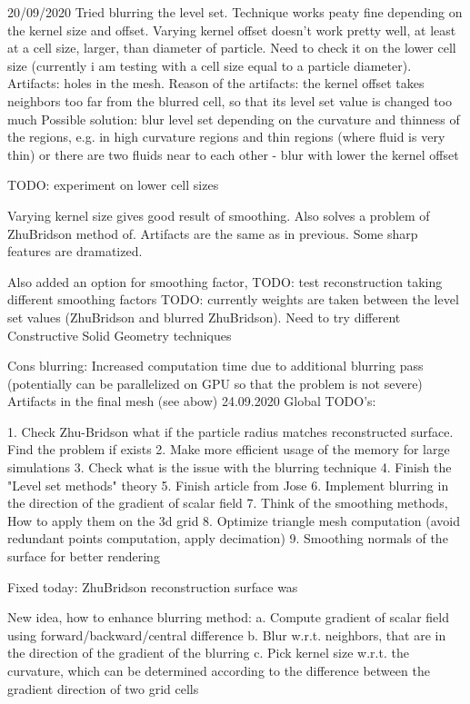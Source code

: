 
20/09/2020
Tried blurring the level set. Technique works peaty fine depending on the kernel size and offset.
Varying kernel offset doesn't work pretty well, at least at a cell size, larger, than diameter of particle. 
Need to check it on the lower cell size (currently i am testing with a cell size equal to a particle diameter).
Artifacts: holes in the mesh.
Reason of the artifacts: the kernel offset takes neighbors too far from the blurred cell, so that its level set value is changed too much
Possible solution: blur level set depending on the curvature and thinness of the regions, e.g. in 
	high curvature regions and thin regions (where fluid is very thin) or there are two fluids near to each other - blur with lower the kernel offset

TODO: experiment on lower cell sizes

Varying kernel size gives good result of smoothing. Also solves a problem of ZhuBridson method of. Artifacts are the same as in previous. 
Some sharp features are dramatized.

Also added an option for smoothing factor, 
TODO: test reconstruction taking different smoothing factors
TODO: currently weights are taken between the level set values (ZhuBridson and blurred ZhuBridson). Need to try different Constructive Solid Geometry techniques

Cons blurring: Increased computation time due to additional blurring pass (potentially can be parallelized on GPU so that the problem is not severe)
				Artifacts in the final mesh (see abow)
24.09.2020
Global TODO's:

1. Check Zhu-Bridson what if the particle radius matches reconstructed surface. Find the problem if exists
2. Make more efficient usage of the memory for large simulations
3. Check what is the issue with the blurring technique
4. Finish the "Level set methods" theory
5. Finish article from Jose
6. Implement blurring in the direction of the gradient of scalar field
7. Think of the smoothing methods, How to apply them on the 3d grid
8. Optimize triangle mesh computation (avoid redundant points computation, apply decimation)
9. Smoothing normals of the surface for better rendering

Fixed today:
ZhuBridson reconstruction surface was 

New idea, how to enhance blurring method:
	a. Compute gradient of scalar field using forward/backward/central difference
	b. Blur w.r.t. neighbors, that are in the direction of the gradient of the blurring
	c. Pick kernel size w.r.t. the curvature, which can be determined according to the difference between the gradient direction of two grid cells

